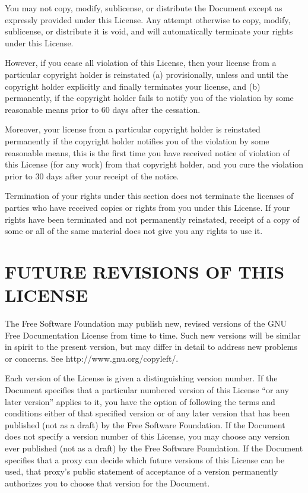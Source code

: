 You may not copy, modify, sublicense, or distribute the
Document except as expressly provided under this License. Any
attempt otherwise to copy, modify, sublicense, or distribute
it is void, and will automatically terminate your rights
under this License.

However, if you cease all violation of this License, then your
license from a particular copyright holder is reinstated (a)
provisionally, unless and until the copyright holder explicitly
and finally terminates your license, and (b) permanently,
if the copyright holder fails to notify you of the violation
by some reasonable means prior to 60 days after the cessation.

Moreover, your license from a particular copyright holder is
reinstated permanently if the copyright holder notifies you
of the violation by some reasonable means, this is the first
time you have received notice of violation of this License
(for any work) from that copyright holder, and you cure the
violation prior to 30 days after your receipt of the notice.

Termination of your rights under this section does not
terminate the licenses of parties who have received copies
or rights from you under this License. If your rights have
been terminated and not permanently reinstated, receipt of
a copy of some or all of the same material does not give you
any rights to use it.

\section{FUTURE REVISIONS OF THIS LICENSE}

The Free Software Foundation may publish new, revised
versions of the GNU Free Documentation License from time to
time. Such new versions will be similar in spirit to the
present version, but may differ in detail to address new
problems or concerns. See http://www.gnu.org/copyleft/.

Each version of the License is given a distinguishing version
number. If the Document specifies that a particular numbered
version of this License “or any later version” applies to
it, you have the option of following the terms and conditions
either of that specified version or of any later version
that has been published (not as a draft) by the Free Software
Foundation. If the Document does not specify a version number
of this License, you may choose any version ever published
(not as a draft) by the Free Software Foundation. If the
Document specifies that a proxy can decide which future
versions of this License can be used, that proxy’s public
statement of acceptance of a version permanently authorizes
you to choose that version for the Document.

